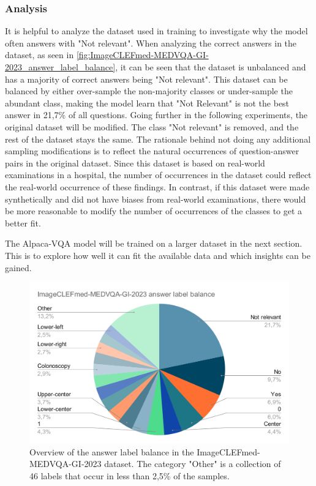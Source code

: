     \subsubsection{Analysis}
    
    It is helpful to analyze the dataset used in training to investigate why the model often answers with "Not relevant".
    When analyzing the correct answers in the dataset, as seen in \autoref{fig:ImageCLEFmed-MEDVQA-GI-2023_answer_label_balance}, it can be seen that the dataset is unbalanced and has a majority of correct answers being "Not relevant". This dataset can be balanced by either over-sample the non-majority classes or under-sample the abundant class, making the model learn that "Not Relevant" is not the best answer in 21,7\% of all questions.
    Going further in the following experiments, the original dataset will be modified. The class "Not relevant" is removed, and the rest of the dataset stays the same. The rationale behind not doing any additional sampling modifications is to reflect the natural occurrences of question-answer pairs in the original dataset. Since this dataset is based on real-world examinations in a hospital, the number of occurrences in the dataset could reflect the real-world occurrence of these findings. In contrast, if this dataset were made synthetically and did not have biases from real-world examinations, there would be more reasonable to modify the number of occurrences of the classes to get a better fit. 
    
    The Alpaca-VQA model will be trained on a larger dataset in the next section. 
    This is to explore how well it can fit the available data and which insights can be gained.


    \begin{figure}[htb]
        \centerline{
        \includegraphics[width=17cm]{images/ImageCLEFmed-MEDVQA-GI-2023_answer_label_balance.png}}
        \caption{Overview of the answer label balance in the ImageCLEFmed-MEDVQA-GI-2023 dataset. 
        The category "Other" is a collection of 46 labels that occur in less than 2,5\% of the samples.}
        \label{fig:ImageCLEFmed-MEDVQA-GI-2023_answer_label_balance}
    \end{figure} 


